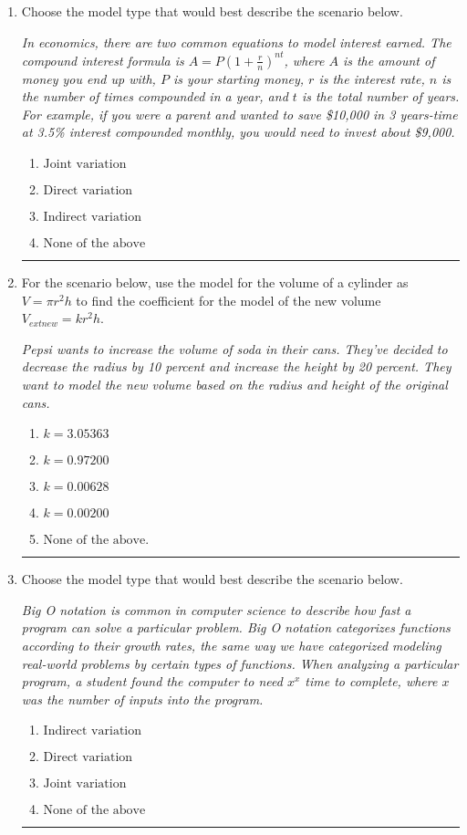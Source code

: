 \documentclass[14pt]{extbook}
\newcommand{\litem}[1]{\item#1\hspace*{-1cm}\rule{\textwidth}{0.4pt}}
\begin{document}
\begin{enumerate}
{\begin{enumerate}[label=\Alph*.]
\end{enumerate} }
\litem{
Choose the model type that would best describe the scenario below.
\begin{center}
    \textit{ In economics, there are two common equations to model interest earned. The compound interest formula is $A = P (1 + \frac{r}{n})^{nt}$, where $A$ is the amount of money you end up with, $P$ is your starting money, $r$ is the interest rate, $n$ is the number of times compounded in a year, and $t$ is the total number of years. For example, if you were a parent and wanted to save \$10,000 in 3 years-time at 3.5\% interest compounded monthly, you would need to invest about \$9,000. }
\end{center}
\begin{enumerate}[label=\Alph*.]
\item \( \text{Joint variation} \)
\item \( \text{Direct variation} \)
\item \( \text{Indirect variation} \)
\item \( \text{None of the above} \)

\end{enumerate} }
\litem{
For the scenario below, use the model for the volume of a cylinder as $V = \pi r^2 h$ to find the coefficient for the model of the new volume $V_{	ext{new}} = k r^2 h$.
\begin{center}
    \textit{ Pepsi wants to increase the volume of soda in their cans. They've decided to decrease the radius by 10 percent and increase the height by 20 percent. They want to model the new volume based on the radius and height of the original cans. }
\end{center}
\begin{enumerate}[label=\Alph*.]
\item \( k = 3.05363 \)
\item \( k = 0.97200 \)
\item \( k = 0.00628 \)
\item \( k = 0.00200 \)
\item \( \text{None of the above.} \)

\end{enumerate} }
\litem{
Choose the model type that would best describe the scenario below.
\begin{center}
    \textit{ Big O notation is common in computer science to describe how fast a program can solve a particular problem. Big O notation categorizes functions according to their growth rates, the same way we have categorized modeling real-world problems by certain types of functions. When analyzing a particular program, a student found the computer to need $x^x$ time to complete, where $x$ was the number of inputs into the program. }
\end{center}
\begin{enumerate}[label=\Alph*.]
\item \( \text{Indirect variation} \)
\item \( \text{Direct variation} \)
\item \( \text{Joint variation} \)
\item \( \text{None of the above} \)


\end{enumerate}}
\end{enumerate}
\end{document}
